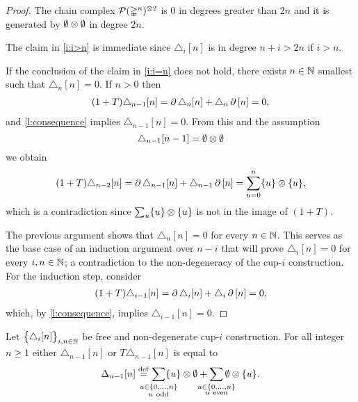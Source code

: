 \begin{proof}
	The chain complex $\mathcal{P}(\mathbb{\Delta}^n)^{\otimes 2}$ is $0$ in degrees greater than $2n$ and it is generated by $\emptyset \otimes \emptyset$ in degree $2n$.

	The claim in \cref{i:i>n} is immediate since $\triangle_i[n]$ is in degree $n+i > 2n$ if $i > n$.

	If the conclusion of the claim in \cref{i:i=n} does not hold, there exists $n \in \mathbb{N}$ smallest such that $\triangle_n [n] = 0$.
	If $n > 0$ then
	\begin{align*}
	(1+T) \triangle_{n-1} [n] =
	\operatorname{\partial} \triangle_{n} [n] + \triangle_{n} \operatorname{\partial} \, [n] = 0,
	\end{align*}
	and \cref{l:consequence} implies $\triangle_{n-1} [n] = 0$.
	From this and the assumption
	\[
	\triangle_{n-1}[n-1] = \emptyset \otimes \emptyset
	\]
	we obtain
	\begin{equation}
	\begin{split}
	(1+T)\triangle_{n-2} [n] =
	\operatorname{\partial} \triangle_{n-1} [n] + \triangle_{n-1} \operatorname{\partial} \, [n] =
	\sum_{u = 0}^n \{u\} \otimes \{u\},
	\end{split}
	\end{equation}
	which is a contradiction since $\sum_u \{u\} \otimes \{u\}$ is not in the image of $(1+T)$.

	The previous argument shows that $\triangle_n [n] = 0$ for every $n \in \mathbb{N}$.
	This serves as the base case of an induction argument over $n-i$ that will prove $\triangle_i [n] = 0$ for every $i, n \in \mathbb{N}$; a contradiction to the non-degeneracy of the cup-$i$ construction.
	For the induction step, consider
	\begin{align*}
	(1+T) \triangle_{i-1} [n] =
	\operatorname{\partial} \triangle_{i} [n] + \triangle_{i} \operatorname{\partial}\, [n] = 0,
	\end{align*}
	which, by \cref{l:consequence}, implies $\triangle_{i-1} [n] = 0$.
\end{proof}

\begin{lemma}\label{l:special case two}
	Let $\big\{ \triangle_i [n] \big\}_{i,n\in\mathbb{N}}$ be free and non-degenerate \mbox{cup-$i$} construction.
	For all integer $n \geq 1$ either $\triangle_{n-1} [n]$ or $T \triangle_{n-1} [n]$ is equal to
	\[
	\Delta_{n-1} [n] \defeq
	\sum_{\mathclap{\substack{u \in \{0,\dots,n\} \\ u \ \mathrm{odd}}}} \{u\} \ot \emptyset +
	\sum_{\mathclap{\substack{u \in \{0,\dots,n\} \\ u \ \mathrm{even}}}} \emptyset \ot \{u\}.
	\]
\end{lemma}

